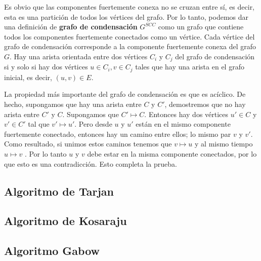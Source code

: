 Es obvio que las componentes fuertemente conexa no se cruzan entre sí, es decir, esta es una partición de 
todos los vértices del grafo. Por lo tanto, podemos dar una definición de \textbf{grafo de condensación} 
$G^{SCC}$ como un grafo que contiene todos los componentes fuertemente conectados como un vértice. Cada 
vértice del grafo de condensación corresponde a la componente fuertemente conexa del grafo $G$. Hay una 
arista orientada entre dos vértices $C_i$ y $C_j$ del grafo de condensación si y solo si hay dos 
vértices $u \in C_i, v \in C_j$ tales que hay una arista en el grafo inicial, es decir, $(u, v) \in E$.

La propiedad más importante del grafo de condensación es que es acíclico. De hecho, supongamos que hay 
una arista entre $C$ y $C'$, demostremos que no hay arista entre $C'$ y $C$. Supongamos que $C' \mapsto 
C$. Entonces hay dos vértices $u' \in C$ y $v' \in C'$ tal que $v' \mapsto u'$. Pero desde $u$ y $u'$ están en el mismo componente fuertemente conectado, entonces hay un camino entre ellos; lo mismo par $v$ y $v'$. Como resultado, si unimos estos caminos tenemos que $v \mapsto u$ y al mismo tiempo $u 
\mapsto v$ . Por lo tanto $u$ y $v$ debe estar en la misma componente conectados, por lo que esto es una contradicción. Esto completa la prueba.

\subsection{Algoritmo de Tarjan}


\subsection{Algoritmo de Kosaraju}


\subsection{Algoritmo Gabow}
